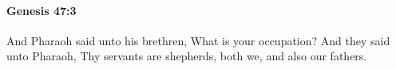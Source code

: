 
		\paragraph{Genesis 47:3} %
			\label{GENESIS-47-3}

			And Pharaoh said unto his brethren, What is your occupation? And they said unto Pharaoh, Thy servants are shepherds, both we, and also our fathers.


